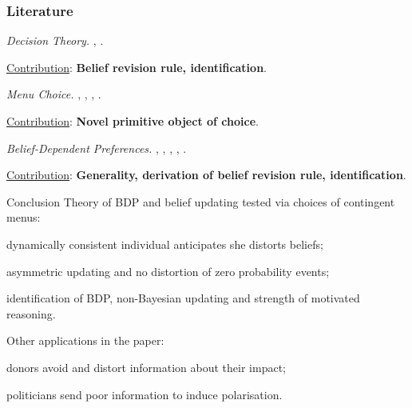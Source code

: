 \documentclass[usenames,dvipsnames,aspectratio=169,11pt]{beamer}
\begin{document}
\begin{frame}\frametitle{Literature}

	\begin{wideitemize}
		\item \textit{Decision Theory.} \cite{liangInformationdependentExpectedUtility2017}, \cite{dillenbergerAdditivebeliefbasedPreferences2020} \cite{rommeswinkelPreferenceKnowledge2023}.

		\vspace{0.3cm}
		\underline{Contribution}: \textbf{Belief revision rule, identification}.
		\item \textit{Menu Choice.} \cite{gulTemptationSelfControl2001}, \cite{ozdenorenCompletingStateSpace2002}, \cite{epsteinAxiomaticModelNonBayesian2006}, \cite{epsteinColdFeet2007}.

		\vspace{0.3cm}
		\underline{Contribution}: \textbf{Novel primitive object of choice}.
		\item \textit{Belief-Dependent Preferences.} \cite{brunnermeierOptimalExpectations2005}, \cite{eliazCanAnticipatoryFeelings2006}, \cite{benabou2016mindful}, \cite{golmanInformationAvoidance2017}, \cite{battigalliBeliefdependentMotivationsPsychological2022}.

		\vspace{0.3cm}
		\underline{Contribution}: \textbf{Generality, derivation of belief revision rule, identification}.
	\end{wideitemize}

\end{frame}

\begin{frame}{Conclusion}
	Theory of BDP and belief updating tested via choices of contingent menus:
	\vfill

	\begin{wideitemize}
		\item dynamically consistent individual anticipates she distorts beliefs;
		\item asymmetric updating and no distortion of zero probability events;
		\item identification of BDP, non-Bayesian updating and strength of motivated reasoning.
	\end{wideitemize}

	\vfill

	Other applications in the paper:

	\vfill

	\begin{wideitemize}
		\item donors avoid and distort information about their impact;
		\item politicians send poor information to induce polarisation.
	\end{wideitemize}

\end{frame}
\end{document}
